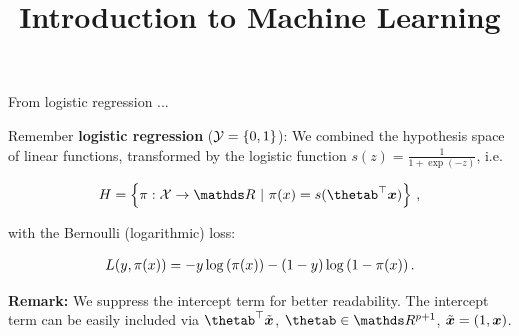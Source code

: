 



\newcommand{\titlefigure}{figure_man/softmax1.png}
\newcommand{\learninggoals}{
  \item \textcolor{blue}{Know what softmax regression means}
  \item \textcolor{blue}{Softmax regression vs logistic regression}
  \item \textcolor{blue}{Softmax regression as a linear discriminator}
}

\title{Introduction to Machine Learning}
\date{}




\sloppy


\begin{vbframe}{From logistic regression ...}

Remember \textbf{logistic regression} ($\mathcal{Y} = \{0, 1\}$): We combined the hypothesis space of linear functions, transformed by the logistic function $s(z) = \frac{1}{1 + \exp(- z)}$, i.e.\

\vspace*{-0.3cm}

\begin{eqnarray*}
  \Hspace = \left\{\pi: \Xspace \to \R ~|~\pix = s(\thetab^\top \xv)\right\}\,,
\end{eqnarray*}

with the Bernoulli (logarithmic) loss: 

\begin{eqnarray*}
  L(y, \pi(x)) = -y \log \left(\pi(x)\right) - (1 - y) \log \left(1 - \pi(x)\right).
\end{eqnarray*}

\vfill

\begin{footnotesize}
  \textbf{Remark:} We suppress the intercept term for better readability. The intercept term can be easily included via $\thetab^\top \tilde\xv$, $\thetab \in \R^{p + 1}$, $\tilde{\bm{x}} = (1, \bm{x})$.
\end{footnotesize}

\end{vbframe}

